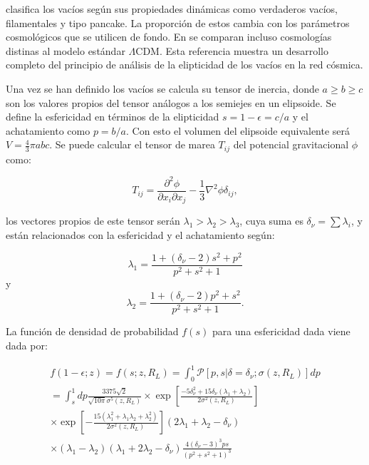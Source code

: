 \documentclass[preprint]{aastex62}
\begin{document}
  \citet{https://arxiv.org/pdf/0906.4101.pdf} clasifica los vacíos
  según sus propiedades dinámicas como verdaderos vacíos, filamentales y tipo pancake.
  La proporción de estos cambia con los parámetros cosmológicos que se utilicen de fondo.
  En \citet{https://arxiv.org/pdf/1205.4238.pdf} se comparan incluso cosmologías distinas al modelo
  estándar $\Lambda$CDM. Esta referencia muestra un desarrollo completo del principio de análisis de
  la elipticidad de los vacíos en la red cósmica.

  Una vez se han definido los vacíos se calcula su tensor de inercia, donde $a \geq b \geq c$ son los
  valores propios del tensor análogos a los semiejes en un elipsoide. Se define la esfericidad en
  términos de la elipticidad $s = 1 - \epsilon = c / a$ y el achatamiento como $ p = b / a$. Con esto
  el volumen del elipsoide equivalente será $V = \frac{4}{3}\pi abc$. Se puede calcular el tensor de
  marea $T_{ij}$ del potencial gravitacional $\phi$ como:

  \begin{equation}
    T_{ij} = \frac{\partial^2 \phi}{\partial x_i \partial x_j} - \frac{1}{3} \nabla^2 \phi \delta_{ij},
  \end{equation}

  los vectores propios de este tensor serán  $\lambda_1 > \lambda_2 > \lambda_3$, cuya suma es
  $\delta_\nu = \sum \lambda_i$, y están relacionados con la esfericidad y el achatamiento según:

  \begin{equation}
    \lambda_1 = \frac{1 + (\delta_\nu -2)s^2 + p^2}{p^2 + s^2 + 1}
 \end{equation}
  y  
  \begin{equation}
    \lambda_2 = \frac{1 + (\delta_\nu -2)p^2 + s^2}{p^2 + s^2 + 1}.
  \end{equation}


  La función de densidad de probabilidad $f(s)$ para una esfericidad dada viene dada por:
  
  \begin{eqnarray}
    f(1-\epsilon;z) = f(s;z, R_L) = \int_0^1 \mathcal{P}\left[ p,s|\delta = \delta_\nu;\sigma(z,R_L)\right] dp \nonumber\\
    = \int_s^1 dp \frac{3375 \sqrt{2}}{ \sqrt{10 \pi} \sigma^5(z,R_L)}
     \times \exp \left[ \frac{-5 \delta_\nu^2 + 15 \delta_\nu ( \lambda_1 + \lambda_2 )}{2 \sigma^2(z,R_L)} \right] \nonumber\\
     \times \exp \left[ - \frac{ 15(\lambda_1^2 + \lambda_1 \lambda_2 + \lambda_2^2)}{ 2\sigma^2(z,R_L)}\right]
    (2\lambda_1 + \lambda_2 - \delta_\nu) \nonumber \\
    \times (\lambda_1 - \lambda_2)( \lambda_1 + 2\lambda_2 - \delta_\nu) \frac{ 4 (\delta_\nu - 3)^3 p s }{ ( p^2 + s^2 + 1)^3}
  \end{eqnarray}
  
\end{document}
